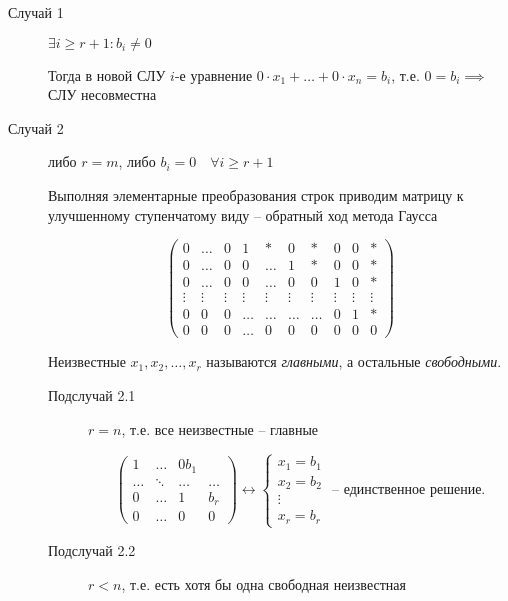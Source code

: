 \begin{description}
\item[Случай 1] $\exists i \geq r + 1 : b_i \neq 0$

    Тогда в новой СЛУ $i$-е уравнение $0 \cdot x_1 + \dots + 0 \cdot x_n = b_i$, т.е. $0 = b_i \implies $ СЛУ несовместна 

\item[Случай 2] либо $r = m$, либо $b_i = 0 \quad \forall i \geq r + 1$

    Выполняя элементарные преобразования строк приводим матрицу к улучшенному ступенчатому виду -- обратный ход метода Гаусса

    \begin{equation*}
        \begin{pmatrix}
            0 & \dots & 0 & 1 & * & 0 & * & 0 & 0 & * \\
            0 & \dots & 0 & 0 & \dots & 1 & * & 0 & 0 & * \\
            0 & \dots & 0 & 0 & \dots & 0 & 0 & 1 & 0 & * \\
            \vdots & \vdots & \vdots & \vdots & \vdots & \vdots & \vdots & \vdots & \vdots & \vdots \\
            0 & 0 & 0 & \dots & \dots & \dots & \dots & 0 & 1 & * \\
            0 & 0 & 0 & \dots & 0 & 0 & 0 & 0 & 0 & 0
        \end{pmatrix}
    \end{equation*}

    Неизвестные $x_1, x_2, \dots, x_r$ называются \textit{главными}, а остальные \textit{свободными}.

    \begin{description}
    \item[Подслучай 2.1] $r = n$, т.е. все неизвестные -- главные 

        \begin{equation*}
            \begin{pmatrix} 
                1 & \dots & 0 b_1 \\
                \dots & \ddots & \dots & \dots \\
                0 & \dots & 1 & b_r \\
                0 & \dots & 0 & 0
            \end{pmatrix} \leftrightarrow \begin{cases}
                x_1 = b_1 \\
                x_2 = b_2 \\
                \vdots \\
                x_r = b_r
            \end{cases} \text{ -- единственное решение}   
        .\end{equation*}
    \item[Подслучай 2.2] $r < n$, т.е. есть хотя бы одна свободная неизвестная
        

\end{description}
\end{description}
